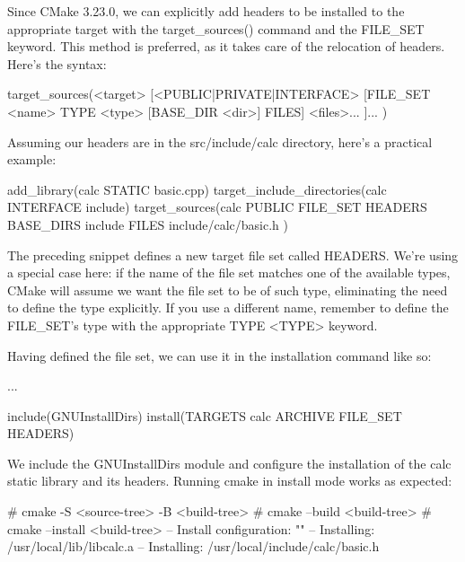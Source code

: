 Since CMake 3.23.0, we can explicitly add headers to be installed to the appropriate target with the target\_sources() command and the FILE\_SET keyword. This method is preferred, as it takes care of the relocation of headers. Here’s the syntax:

\begin{shell}
target_sources(<target>
    [<PUBLIC|PRIVATE|INTERFACE>
        [FILE_SET <name> TYPE <type> [BASE_DIR <dir>] FILES]
        <files>...
    ]...
)
\end{shell}

Assuming our headers are in the src/include/calc directory, here’s a practical example:


\begin{cmake}
add_library(calc STATIC basic.cpp)
target_include_directories(calc INTERFACE include)
target_sources(calc PUBLIC FILE_SET HEADERS
                           BASE_DIRS include
                           FILES include/calc/basic.h
)
\end{cmake}

The preceding snippet defines a new target file set called HEADERS. We’re using a special case here: if the name of the file set matches one of the available types, CMake will assume we want the file set to be of such type, eliminating the need to define the type explicitly. If you use a different name, remember to define the FILE\_SET's type with the appropriate TYPE <TYPE> keyword.

Having defined the file set, we can use it in the installation command like so:


\begin{cmake}
...

include(GNUInstallDirs)
install(TARGETS calc ARCHIVE FILE_SET HEADERS)
\end{cmake}

We include the GNUInstallDirs module and configure the installation of the calc static library and its headers. Running cmake in install mode works as expected:

\begin{shell}
# cmake -S <source-tree> -B <build-tree>
# cmake --build <build-tree>
# cmake --install <build-tree>
-- Install configuration: ""
-- Installing: /usr/local/lib/libcalc.a
-- Installing: /usr/local/include/calc/basic.h
\end{shell}

